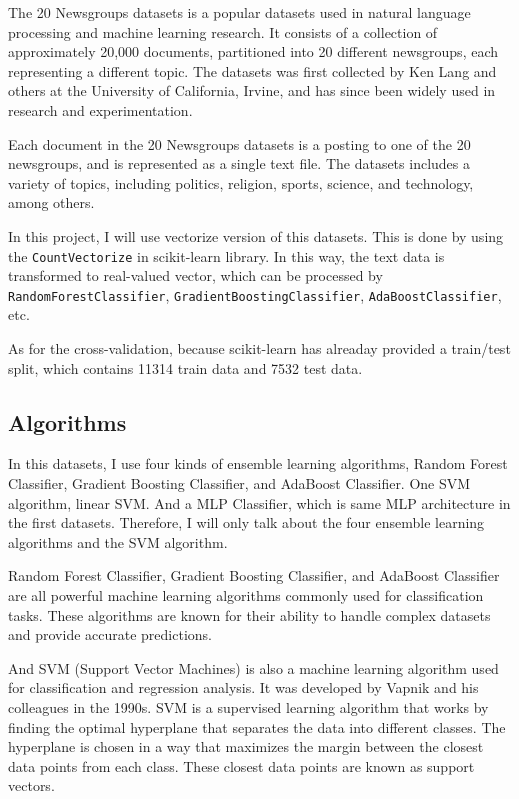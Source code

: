 \documentclass[twocolumn]{extarticle}
\begin{document}
The 20 Newsgroups datasets is a popular datasets used in natural language processing and machine learning research. It consists of a collection of approximately 20,000 documents, partitioned into 20 different newsgroups, each representing a different topic. The datasets was first collected by Ken Lang and others at the University of California, Irvine, and has since been widely used in research and experimentation.

Each document in the 20 Newsgroups datasets is a posting to one of the 20 newsgroups, and is represented as a single text file. The datasets includes a variety of topics, including politics, religion, sports, science, and technology, among others.

In this project, I will use vectorize version of this datasets. This is done by using the \texttt{CountVectorize} in scikit-learn library. In this way, the text data is transformed to real-valued vector, which can be processed by \texttt{RandomForestClassifier}, \texttt{GradientBoostingClassifier}, \texttt{AdaBoostClassifier}, etc.

As for the cross-validation, because scikit-learn has alreaday provided a train/test split, which contains 11314 train data and 7532 test data. 

\subsection{Algorithms}

In this datasets, I use four kinds of ensemble learning algorithms, Random Forest Classifier, Gradient Boosting Classifier, and AdaBoost Classifier. One SVM algorithm, linear SVM. And a MLP Classifier, which is same MLP architecture in the first datasets. Therefore, I will only talk about the four ensemble learning algorithms and the SVM algorithm.

Random Forest Classifier, Gradient Boosting Classifier, and AdaBoost Classifier are all powerful machine learning algorithms commonly used for classification tasks. These algorithms are known for their ability to handle complex datasets and provide accurate predictions.

And SVM (Support Vector Machines) is also a machine learning algorithm used for classification and regression analysis. It was developed by Vapnik and his colleagues in the 1990s. SVM is a supervised learning algorithm that works by finding the optimal hyperplane that separates the data into different classes. The hyperplane is chosen in a way that maximizes the margin between the closest data points from each class. These closest data points are known as support vectors.
\end{document}
